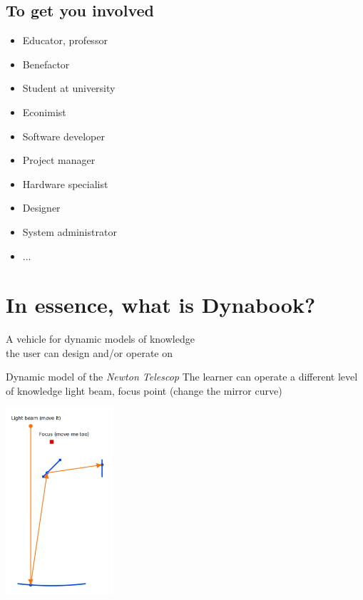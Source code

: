 \documentclass{beamer}
\begin{document}
\subsection{To get you involved}
\begin{frame}
  \begin{itemize}
  \item Educator, professor
  \item Benefactor
  \item Student at university
  \item Econimist
  \item Software developer
  \item Project manager
  \item Hardware specialist
  \item Designer
  \item System administrator
  \item ...
  \end{itemize}
\end{frame}

\section{In essence, what is Dynabook?}
\begin{frame}
  \fontsize{14pt}{8pt}\selectfont
\begin{center}
  A vehicle for dynamic models of knowledge\\ the user can design and/or operate on
\end{center}
\end{frame}
%
\begin{frame}{Dynamic model of the \emph{Newton Telescop}}
  The learner can operate a different level of knowledge light beam,
  focus point (change the mirror curve)
\begin{center}
  \includegraphics[width=0.3\textwidth]{Newton.png}
\end{center}
\end{frame}
\end{document}
